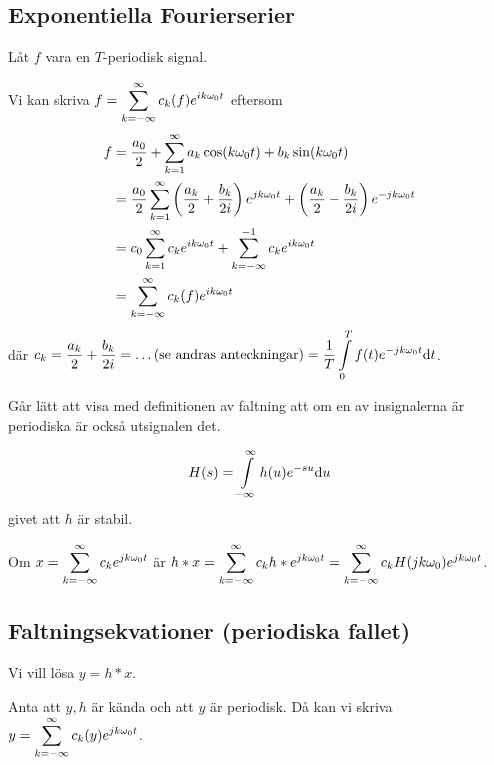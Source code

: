 \documentclass[a4paper]{article}
\begin{document}
\providecommand\fname{}
\renewcommand\fname{19-09-13}

\subsection{Exponentiella Fourierserier}
Låt \(
    f
\) vara en \(
    T
\)-periodisk signal. 

Vi kan skriva \(
    f = \displaystyle\sum_{k = -\infty}^\infty c_k(f) e^{i k \omega_0 t}
\) eftersom 
\begin{align*}
    f &= \displaystyle\frac{a_0}{2} + \displaystyle\sum_{k=1}^\infty a_k \cos(k \omega_0 t) + b_k \sin(k \omega_0 t) \\
      &= \displaystyle\frac{a_0}{2} \displaystyle\sum_{k=1}^\infty \left( \displaystyle\frac{a_k}{2} + \displaystyle\frac{b_k}{2i}  \right) e^{j k \omega_0 t} + \left( \displaystyle\frac{a_k}{2} - \displaystyle\frac{b_k}{2i}  \right) e^{-j k \omega_0 t} \\
      &= c_0 \displaystyle\sum_{k=1}^\infty c_ke^{ik\omega_0 t} + \displaystyle\sum_{k=-\infty} ^{-1} c_k e^{ik\omega_0 t} \\
      &= \displaystyle\sum_{k = -\infty}^\infty c_k(f) e^{i k \omega_0 t}
\end{align*}
där \(
    c_k = \displaystyle\frac{a_k}{2}  + \displaystyle\frac{b_k}{2i} = \dots \text{(se andras anteckningar)} 
    = \frac{1}{T} \displaystyle\int\limits_0^T f(t) e^{-jk\omega_0 t} \dd t
\).

\begin{anm}
    Går lätt att visa med definitionen av faltning att om en av insignalerna är periodiska är också utsignalen det.
\end{anm}

\begin{defn}
    \[
        H(s) = \displaystyle\int\limits_{-\infty}^\infty h(u) e^{-su} \dd u
    \] 
    givet att \(
        h
    \) är stabil.
\end{defn}

Om \(
    x = \displaystyle\sum_{k = -\infty}^\infty c_k e^{jk\omega_0 t}
\) är \(
    h * x = \displaystyle\sum_{k = -\infty}^\infty c_k h * e^{jk\omega_0 t}
    = \displaystyle\sum_{k = -\infty}^\infty c_k H(jk\omega_0) e^{jk\omega_0 t}
\).

\subsection{Faltningsekvationer (periodiska fallet)}
Vi vill lösa \(
    y = h * x
\).

Anta att \(
    y, h
\) är kända och att \(
    y
\) är periodisk. Då kan vi skriva \(
    y = \displaystyle\sum_{k = -\infty}^\infty c_k(y) e^{jk\omega_0 t}
\).
\end{document}
